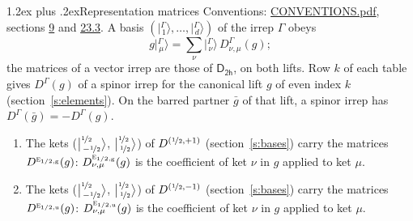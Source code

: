 \documentclass[10pt,a4paper]{article}
\makeatletter
\renewcommand\section{\@startsection{section}{1}{\z@}{-3ex plus -1ex minus -.2ex}%
  {1.2ex plus .2ex}{\normalfont\large\sffamily\bfseries\color{parttitle}}}
\numberwithin{equation}{section}
\newcommand{\grp}[1]{\mathsf{#1}}
\newcommand{\irr}[1]{\text{\normalfont\scshape #1}}
\newcommand{\ptag}[1]{\mathrm{#1}}
\newcommand{\irrJp}[2]{D^{(#1,#2)}}
\newcommand{\repD}[1]{D^{#1}}
\newcommand{\intx}{\mu}
\newcommand{\jm}[2]{\bigl\lvert{}^{#1}_{\,#2}\bigr\rangle}
\newcommand{\irket}[2]{\bigl\lvert{}^{#1}_{\,#2}\bigr\rangle}
\newcommand{\barred}[1]{\bar{#1}}
\newenvironment{romanlist}{\begin{enumerate}%
\renewcommand{\labelenumi}{(\roman{enumi})}}%
  {\end{enumerate}}
\makeatother
\begin{document}
\section{Representation matrices}\label{s:irrep_matrices}
Conventions: \href{../../CONVENTIONS.pdf}{CONVENTIONS.pdf}, sections \href{../../../rotation/CONVENTIONS.pdf\#conv.9}{9} and \href{../../CONVENTIONS.pdf\#conv.23.3}{23.3}.
\leavevmode\label{n:vector.ket.partner}\label{n:index.partner}\label{n:matrix.irrep}\label{n:index.partner.summed}A basis $(\irket{\Gamma}{1}, \dots, \irket{\Gamma}{d})$ of the irrep $\Gamma$ obeys
\begin{equation}\label{e:partner}g\irket{\Gamma}{\intx} = \sum_\nu \irket{\Gamma}{\nu}\, \repD{\Gamma}_{\nu,\intx}(g);\end{equation}
the matrices of a vector irrep are those of \href{../../../rotation/data/pdf/D2h.pdf}{$\grp{D_{2h}}$}, on both lifts. Row $k$ of each table gives $\repD{\Gamma}(g)$ of a spinor irrep for the canonical lift $g$ of even index $k$ (section~\ref{s:elements}). On the barred partner $\barred{g}$ of that lift, a spinor irrep has $\repD{\Gamma}(\barred{g}) = -\repD{\Gamma}(g)$.
\begin{romanlist}\raggedright
\item The kets ($\jm{\nicefrac{1}{2}}{-\nicefrac{1}{2}}$, $\jm{\nicefrac{1}{2}}{\nicefrac{1}{2}}$) of $\irrJp{\nicefrac{1}{2}}{+1}$ (section~\ref{s:bases}) carry the matrices $\repD{\irr{e}_{1/2,\ptag{g}}}(g)$: $\repD{\irr{e}_{1/2,\ptag{g}}}_{\nu,\intx}(g)$ is the coefficient of ket $\nu$ in $g$ applied to ket $\intx$.
\item The kets ($\jm{\nicefrac{1}{2}}{-\nicefrac{1}{2}}$, $\jm{\nicefrac{1}{2}}{\nicefrac{1}{2}}$) of $\irrJp{\nicefrac{1}{2}}{-1}$ (section~\ref{s:bases}) carry the matrices $\repD{\irr{e}_{1/2,\ptag{u}}}(g)$: $\repD{\irr{e}_{1/2,\ptag{u}}}_{\nu,\intx}(g)$ is the coefficient of ket $\nu$ in $g$ applied to ket $\intx$.
\end{romanlist}
\end{document}
